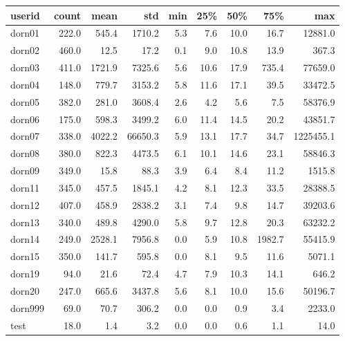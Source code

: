 \begin{tabular}{lrrrrrrrr}
\toprule
  userid &  count &    mean &      std &  min &   25\% &   50\% &     75\% &        max \\
\midrule
  dorn01 &  222.0 &   545.4 &   1710.2 &  5.3 &   7.6 &  10.0 &    16.7 &    12881.0 \\
  dorn02 &  460.0 &    12.5 &     17.2 &  0.1 &   9.0 &  10.8 &    13.9 &      367.3 \\
  dorn03 &  411.0 &  1721.9 &   7325.6 &  5.6 &  10.6 &  17.9 &   735.4 &    77659.0 \\
  dorn04 &  148.0 &   779.7 &   3153.2 &  5.8 &  11.6 &  17.1 &    39.5 &    33472.5 \\
  dorn05 &  382.0 &   281.0 &   3608.4 &  2.6 &   4.2 &   5.6 &     7.5 &    58376.9 \\
  dorn06 &  175.0 &   598.3 &   3499.2 &  6.0 &  11.4 &  14.5 &    20.2 &    43851.7 \\
  dorn07 &  338.0 &  4022.2 &  66650.3 &  5.9 &  13.1 &  17.7 &    34.7 &  1225455.1 \\
  dorn08 &  380.0 &   822.3 &   4473.5 &  6.1 &  10.1 &  14.6 &    23.1 &    58846.3 \\
  dorn09 &  349.0 &    15.8 &     88.3 &  3.9 &   6.4 &   8.4 &    11.2 &     1515.8 \\
  dorn11 &  345.0 &   457.5 &   1845.1 &  4.2 &   8.1 &  12.3 &    33.5 &    28388.5 \\
  dorn12 &  407.0 &   458.9 &   2838.2 &  3.1 &   7.4 &   9.8 &    14.7 &    39203.6 \\
  dorn13 &  340.0 &   489.8 &   4290.0 &  5.8 &   9.7 &  12.8 &    20.3 &    63232.2 \\
  dorn14 &  249.0 &  2528.1 &   7956.8 &  0.0 &   5.9 &  10.8 &  1982.7 &    55415.9 \\
  dorn15 &  350.0 &   141.7 &    595.8 &  0.0 &   8.1 &   9.5 &    11.6 &     5071.1 \\
  dorn19 &   94.0 &    21.6 &     72.4 &  4.7 &   7.9 &  10.3 &    14.1 &      646.2 \\
  dorn20 &  247.0 &   665.6 &   3437.8 &  5.6 &   8.1 &  10.0 &    15.6 &    50196.7 \\
 dorn999 &   69.0 &    70.7 &    306.2 &  0.0 &   0.0 &   0.9 &     3.4 &     2233.0 \\
    test &   18.0 &     1.4 &      3.2 &  0.0 &   0.0 &   0.6 &     1.1 &       14.0 \\
\bottomrule
\end{tabular}
